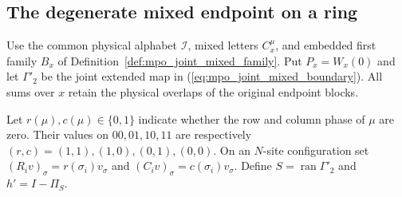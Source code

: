 
\subsection{The degenerate mixed endpoint on a ring}
\label{sec:mpo_joint_periodic_endpoint}

Use the common physical alphabet $\mathcal I$, mixed letters $C_x^\mu$,
and embedded first family $B_x$ of
Definition~\ref{def:mpo_joint_mixed_family}. Put $P_x=W_x(0)$ and let
$\Gamma'_2$ be the joint extended map in
(\ref{eq:mpo_joint_mixed_boundary}). All sums over $x$ retain the physical
overlaps of the original endpoint blocks.

\begin{definition}
    \label{def:mpo_joint_phase_projections}
    \leanok
    Let $r(\mu),c(\mu)\in\{0,1\}$ indicate whether the row and column
    phase of $\mu$ are zero. Their values on $00,01,10,11$ are respectively
    $(r,c)=(1,1),(1,0),(0,1),(0,0)$. On an $N$-site configuration set
    $(R_i v)_\sigma=r(\sigma_i)v_\sigma$ and
    $(C_i v)_\sigma=c(\sigma_i)v_\sigma$. Define
    $S=\operatorname{ran}\Gamma'_2$ and $h'=I-\Pi_S$.
\end{definition}

